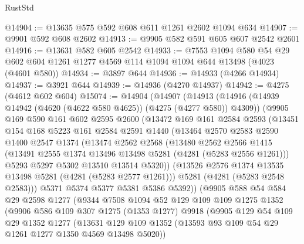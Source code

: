 \begin{lexlean}{RustStd}
\begin{coremodule}
{\begin{coremodule}
{{{{{{{{{{{{{{{{{{{{{{{{{{{{{{{{{{{@14904 := @13635 @575 @592 @608 @611 @1261 @2602 @1094 @634
@14907 := @9901 @592 @608 @2602
@14913 := @9905 @582 @591 @605 @607 @2542 @2601
@14916 := @13631 @582 @605 @2542
@14933 := @7553
    @1094
    @580
    @54
    @29
    @602
    @604
    @1261
    @1277
    @4569
    @114
    @1094
    @1094
    @644
    @13498
    (@4023 (@4601 @580))
@14934 := @3897 @644
@14936 := @14933 (@4266 @14934)
@14937 := @3921 @644
@14939 := @14936 (@4270 @14937)
@14942 := @4275 (@4612 @602 @604)
@15074 := @14904
    (@14907
      (@14913
        (@14916 (@14939 @14942 (@4620 (@4622 @580 @4625)) (@4275 (@4277 @580)) @4309))
        (@9905
          @169
          @590
          @161
          @602
          @2595
          @2600
          (@13472
            @169
            @161
            @2584
            @2593
            (@13451
              @154
              @168
              @5223
              @161
              @2584
              @2591
              @1440
              (@13464
                @2570
                @2583
                @2590
                @1400
                @2547
                @1374
                (@13474
                  @2562
                  @2568
                  (@13480
                    @2562
                    @2566
                    @1415
                    (@13491 @2555 @1374 @13496 @13498 @5281 (@4281 (@5283 @2556 @1261)))
                    @5293
                    @5297
                    @5302
                    @13510
                    @13514
                    @5320))
                (@13526 @2576 @1374 @13535 @13498 @5281 (@4281 (@5283 @2577 @1261)))
                @5281
                (@4281 (@5283 @2548 @2583)))
              @5371
              @5374
              @5377
              @5381
              @5386
              @5392))
          (@9905
            @588
            @54
            @584
            @29
            @2598
            @1277
            (@9344
              @7508
              @1094
              @52
              @129
              @109
              @109
              @1275
              @1352
              (@9906
                @586
                @109
                @307
                @1275
                (@1353 @1277)
                @9918
                (@9905
                  @129
                  @54
                  @109
                  @29
                  @1352
                  @1277
                  (@13631
                    @129
                    @109
                    @1352
                    (@13593 @93 @109 @54 @29 @1261 @1277 @1350 @4569 @13498 @5020))
}}}}}}}}}}}}}}}}}}}}}}}}}}}}}}}}}}}
\end{coremodule}}
\end{coremodule}
\end{lexlean}
